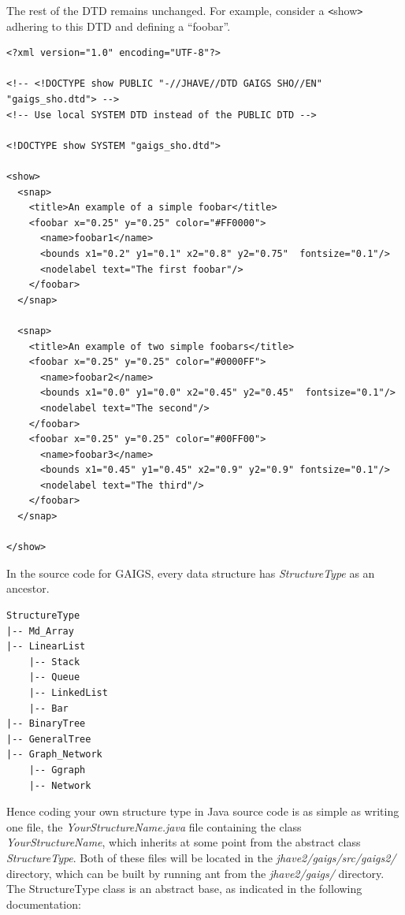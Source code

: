 \documentclass[12pt]{article}
\begin{document}
The rest of the DTD remains unchanged.
For example, consider a \verb'<'show\verb'>' adhering to this DTD and defining a ``foobar''.

\footnotesize \begin{verbatim}  
<?xml version="1.0" encoding="UTF-8"?>

<!-- <!DOCTYPE show PUBLIC "-//JHAVE//DTD GAIGS SHO//EN" "gaigs_sho.dtd"> --> 
<!-- Use local SYSTEM DTD instead of the PUBLIC DTD -->

<!DOCTYPE show SYSTEM "gaigs_sho.dtd">  

<show>
  <snap>
    <title>An example of a simple foobar</title>
    <foobar x="0.25" y="0.25" color="#FF0000">
      <name>foobar1</name>
      <bounds x1="0.2" y1="0.1" x2="0.8" y2="0.75"  fontsize="0.1"/>
      <nodelabel text="The first foobar"/>
    </foobar>
  </snap>

  <snap>
    <title>An example of two simple foobars</title>
    <foobar x="0.25" y="0.25" color="#0000FF">
      <name>foobar2</name>
      <bounds x1="0.0" y1="0.0" x2="0.45" y2="0.45"  fontsize="0.1"/>
      <nodelabel text="The second"/>
    </foobar>
    <foobar x="0.25" y="0.25" color="#00FF00">
      <name>foobar3</name>
      <bounds x1="0.45" y1="0.45" x2="0.9" y2="0.9" fontsize="0.1"/>
      <nodelabel text="The third"/>
    </foobar>
  </snap>

</show>
\end{verbatim}
\normalsize
  
In the source code for GAIGS, every data structure has
\textit{StructureType} as an ancestor.

\small
\begin{verbatim}
StructureType 
|-- Md_Array     
|-- LinearList   
    |-- Stack       
    |-- Queue       
    |-- LinkedList                  
    |-- Bar                         
|-- BinaryTree                   
|-- GeneralTree        
|-- Graph_Network     
    |-- Ggraph           
    |-- Network          
\end{verbatim}
\normalsize


Hence coding your own structure type in Java source code is as simple
as writing one file, the \textit{YourStructureName.java} file
containing the class \textit{YourStructureName}, which inherits at
some point from the abstract class \textit{StructureType}. Both of
these files will be located in the \textit{jhave2/gaigs/src/gaigs2/}
directory, which can be built by running ant from the
\textit{jhave2/gaigs/} directory.  The StructureType class is an
abstract base, as indicated in the following documentation:
\end{document}
